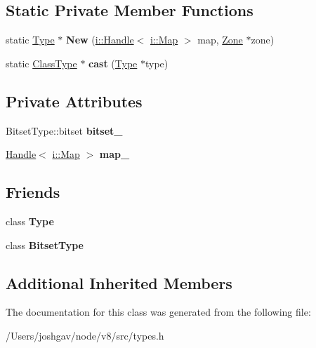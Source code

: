 \subsection*{Static Private Member Functions}
\begin{DoxyCompactItemize}
\item 
static \hyperlink{classv8_1_1internal_1_1_type}{Type} $\ast$ {\bfseries New} (\hyperlink{classv8_1_1internal_1_1_handle}{i\+::\+Handle}$<$ \hyperlink{classv8_1_1internal_1_1_map}{i\+::\+Map} $>$ map, \hyperlink{classv8_1_1internal_1_1_zone}{Zone} $\ast$zone)\hypertarget{classv8_1_1internal_1_1_class_type_afd07106c50b566b64fff478ee8138d0f}{}\label{classv8_1_1internal_1_1_class_type_afd07106c50b566b64fff478ee8138d0f}

\item 
static \hyperlink{classv8_1_1internal_1_1_class_type}{Class\+Type} $\ast$ {\bfseries cast} (\hyperlink{classv8_1_1internal_1_1_type}{Type} $\ast$type)\hypertarget{classv8_1_1internal_1_1_class_type_aaccbf3b1b07b4fd5f050442d0695c418}{}\label{classv8_1_1internal_1_1_class_type_aaccbf3b1b07b4fd5f050442d0695c418}

\end{DoxyCompactItemize}
\subsection*{Private Attributes}
\begin{DoxyCompactItemize}
\item 
Bitset\+Type\+::bitset {\bfseries bitset\+\_\+}\hypertarget{classv8_1_1internal_1_1_class_type_af24da5604000f08814d5eb511291283e}{}\label{classv8_1_1internal_1_1_class_type_af24da5604000f08814d5eb511291283e}

\item 
\hyperlink{classv8_1_1internal_1_1_handle}{Handle}$<$ \hyperlink{classv8_1_1internal_1_1_map}{i\+::\+Map} $>$ {\bfseries map\+\_\+}\hypertarget{classv8_1_1internal_1_1_class_type_af635ee9c9e441291eb107493986f7db3}{}\label{classv8_1_1internal_1_1_class_type_af635ee9c9e441291eb107493986f7db3}

\end{DoxyCompactItemize}
\subsection*{Friends}
\begin{DoxyCompactItemize}
\item 
class {\bfseries Type}\hypertarget{classv8_1_1internal_1_1_class_type_a18dba29b4f3e91d6d2bc53472a6bb7cc}{}\label{classv8_1_1internal_1_1_class_type_a18dba29b4f3e91d6d2bc53472a6bb7cc}

\item 
class {\bfseries Bitset\+Type}\hypertarget{classv8_1_1internal_1_1_class_type_ae1bc4470107e0fde432ac5e20204635d}{}\label{classv8_1_1internal_1_1_class_type_ae1bc4470107e0fde432ac5e20204635d}

\end{DoxyCompactItemize}
\subsection*{Additional Inherited Members}


The documentation for this class was generated from the following file\+:\begin{DoxyCompactItemize}
\item 
/\+Users/joshgav/node/v8/src/types.\+h\end{DoxyCompactItemize}

